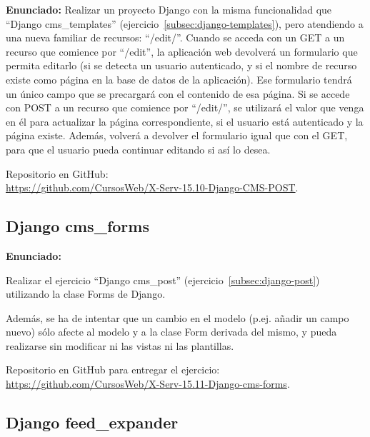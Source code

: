 \textbf{Enunciado:}
 Realizar un proyecto Django con la misma funcionalidad que ``Django cms\_templates'' (ejercicio~\ref{subsec:django-templates}), pero atendiendo a una nueva familiar de recursos: ``/edit/''. Cuando se acceda con un GET a un recurso que comience por ``/edit'', la aplicación web devolverá un formulario que permita editarlo (si se detecta un usuario autenticado, y si el nombre de recurso existe como página en la base de datos de la aplicación). Ese formulario tendrá un único campo que se precargará con el contenido de esa página. Si se accede con POST a un recurso que comience por ``/edit/'', se utilizará el valor que venga en él para actualizar la página correspondiente, si el usuario está autenticado y la página existe. Además, volverá a devolver el formulario igual que con el GET, para que el usuario pueda continuar editando si así lo desea.
 
Repositorio en GitHub: \\
\url{https://github.com/CursosWeb/X-Serv-15.10-Django-CMS-POST}.

\subsection{Django cms\_forms}
\label{subsec:django-forms}

\textbf{Enunciado:}

Realizar el ejercicio ``Django cms\_post'' (ejercicio~\ref{subsec:django-post}) utilizando la clase Forms de Django. 

Además, se ha de intentar que un cambio en el modelo (p.ej. añadir un campo nuevo) sólo afecte al modelo y a la clase Form derivada del mismo, y pueda realizarse sin modificar ni las vistas ni las plantillas.

Repositorio en GitHub para entregar el ejercicio: \\ 
\url{https://github.com/CursosWeb/X-Serv-15.11-Django-cms-forms}.


\subsection{Django feed\_expander}
\label{subsec:django-feed-expander}

